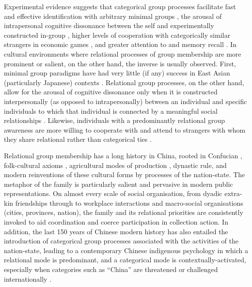 {  Experimental evidence suggests that categorical group processes facilitate fast and effective identification with arbitrary minimal groups \citep{Diehl1990,VanBavel2014}, the arousal of intrapersonal cognitive dissonance between the self and experimentally constructed in-group \citep{Festinger1957, Stone2001}, higher levels of cooperation with categorically similar strangers in economic games \citep{Yuki2005,Yuki2003}, and greater attention to and memory recall \citep{Buchan2006,Ng2016}.  In cultural environments where relational processes of group membership are more prominent or salient, on the other hand, the inverse is usually observed. First, minimal group paradigms have had very little (if any) success in East Asian (particularly Japanese) contexts \citep{Liu2009}.  Relational group processes, on the other hand, allow for the arousal of cognitive dissonance only when it is constructed interpersonally (as opposed to intrapersonally) between an individual and specific individuals to which that individual is connected by a meaningful social relationships \citep{Hoshino-Browne2005}.  Likewise, individuals with a predominantly relational group awareness are more willing to cooperate with and attend to strangers with whom they share relational rather than categorical ties \citep{Ng2016,Yuki2005}.

  Relational group membership has a long history in China, rooted in Confucian \citep{Hwang1999}, folk-cultural axioms \citep{Wang2009}, agricultural modes of production \citep{Talhelm2014,Fei1992}, dynastic rule, and modern reinventions of these cultural forms by processes of the nation-state\citep{Liu2014}. The metaphor of the family is particularly salient and pervasive in modern public representations.  On almost every scale of social organisation, from dyadic extra-kin friendships through to workplace interactions and macro-social organisations (cities, provinces, nation), the family and its relational priorities are consistently invoked to aid coordination and coerce participation in collection action.
  In addition, the last 150 years of Chinese modern history has also entailed the introduction of categorical group processes associated with the activities of the nation-state, leading to a contemporary Chinese indigenous psychology in which a relational mode is predominant, and a categorical mode is contextually-activated, especially when categories such as ``China'' are threatened or challenged internationally \citep{Liu2009}.


}
